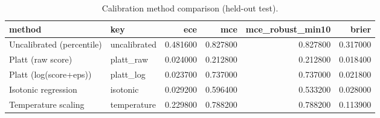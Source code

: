 \begin{table}
\caption{Calibration method comparison (held-out test).}
\label{tab:calibration}
\begin{tabular}{llrrrr}
\toprule
method & key & ece & mce & mce_robust_min10 & brier \\
\midrule
Uncalibrated (percentile) & uncalibrated & 0.481600 & 0.827800 & 0.827800 & 0.317000 \\
Platt (raw score) & platt_raw & 0.024000 & 0.212800 & 0.212800 & 0.018400 \\
Platt (log(score+eps)) & platt_log & 0.023700 & 0.737000 & 0.737000 & 0.021800 \\
Isotonic regression & isotonic & 0.029200 & 0.596400 & 0.533200 & 0.028000 \\
Temperature scaling & temperature & 0.229800 & 0.788200 & 0.788200 & 0.113900 \\
\bottomrule
\end{tabular}
\end{table}
